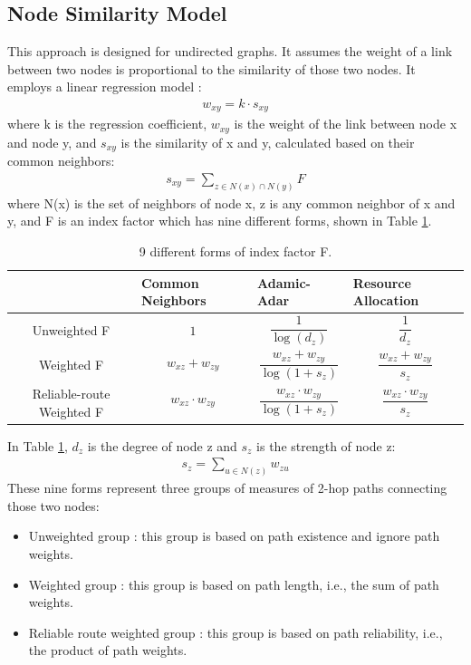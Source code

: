\documentclass[11pt,twocolumn]{article}
\begin{document}
\subsection{Node Similarity Model}
This approach is designed for undirected graphs.
It assumes the weight of a link between two nodes 
is proportional to the similarity of those two nodes.
It employs a linear regression model \cite{zhao2015prediction}:
\begin{align*}
	w_{xy} = k \cdot s_{xy}
\end{align*}
where k is the regression coefficient,
$ w_{xy} $ is the weight of the link between node x and node y,
and $ s_{xy} $ is the similarity of x and y, calculated based on their common neighbors:
\begin{align*}
	s_{xy} = \sum_{z \in N(x) \cap N(y)} F
\end{align*}
where N(x) is the set of neighbors of node x, z is any common neighbor of x and y,
and F is an index factor which has nine different forms, shown in Table \ref{tab:indexes}.
\begin{table}[!ht]\centering
	\caption{9 different forms of index factor F.}
	\begin{tabularx}{\textwidth}{>{\columncolor{blue!30}}cXXX}  \hline \rowcolor{blue!30}
		& Common Neighbors & Adamic-Adar & Resource Allocation \\ \hline
		Unweighted F &
		\[1\] &
		\[\frac{1}{\log(d_z)}\] &
		\[\frac{1}{d_z}\] \\ \hline
		Weighted F &
		\[w_{xz} + w_{zy}\] &
		\[\frac{w_{xz} + w_{zy}}{\log(1 + s_z)}\] &
		\[\frac{w_{xz} + w_{zy}}{s_z}\] \\ \hline
		Reliable-route Weighted F &
		\[ w_{xz} \cdot w_{zy}\] &
		\[\frac{w_{xz} \cdot w_{zy}}{\log(1 + s_z)}\] &
		\[\frac{w_{xz} \cdot w_{zy}}{s_z}\] \\ \hline
	\end{tabularx}
	\label{tab:indexes}
\end{table}
In Table \ref{tab:indexes}, $ d_z $ is the degree of node z and $ s_z $ is the strength of node z:
\begin{align*}
s_z = \sum_{u \in N(z)} w_{zu}
\end{align*}
These nine forms represent three groups of measures of 2-hop paths connecting those two nodes:
\begin{itemize}
	\item Unweighted group \cite{adamic2003friends}:
	this group is based on path existence and ignore path weights.
	\item Weighted group \cite{murata2007link}:
	this group is based on path length, i.e., the sum of path weights.
	\item Reliable route weighted group \cite{taha1982operations}:
	this group is based on path reliability, i.e., the product of path weights.
\end{itemize}
\end{document}
